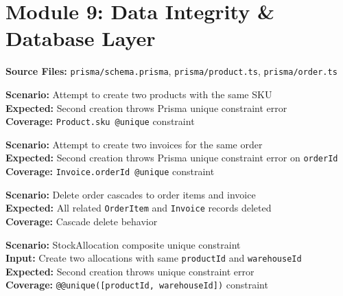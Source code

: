 ﻿\documentclass[12pt,a4paper]{report}
\newcommand{\pone}{\textbf{\color{p1red}P1}}
\newcommand{\ptwo}{\textbf{\color{p2orange}P2}}
\begin{document}
\section{Module 9: Data Integrity \& Database Layer}

\textbf{Source Files:} \texttt{prisma/schema.prisma}, \texttt{prisma/product.ts}, \texttt{prisma/order.ts}

\begin{tcolorbox}[criticalbox,title={DB-001 \hfill \pone\ --- SKU Uniqueness}]
\textbf{Scenario:} Attempt to create two products with the same SKU \\
\textbf{Expected:} Second creation throws Prisma unique constraint error \\
\textbf{Coverage:} \texttt{Product.sku @unique} constraint
\end{tcolorbox}

\begin{tcolorbox}[criticalbox,title={DB-002 \hfill \pone\ --- Invoice Uniqueness}]
\textbf{Scenario:} Attempt to create two invoices for the same order \\
\textbf{Expected:} Second creation throws Prisma unique constraint error on \texttt{orderId} \\
\textbf{Coverage:} \texttt{Invoice.orderId @unique} constraint
\end{tcolorbox}

\begin{tcolorbox}[testbox,title={DB-003 \hfill \ptwo}]
\textbf{Scenario:} Delete order cascades to order items and invoice \\
\textbf{Expected:} All related \texttt{OrderItem} and \texttt{Invoice} records deleted \\
\textbf{Coverage:} Cascade delete behavior
\end{tcolorbox}

\begin{tcolorbox}[testbox,title={DB-004 \hfill \ptwo}]
\textbf{Scenario:} StockAllocation composite unique constraint \\
\textbf{Input:} Create two allocations with same \texttt{productId} and \texttt{warehouseId} \\
\textbf{Expected:} Second creation throws unique constraint error \\
\textbf{Coverage:} \texttt{@@unique([productId, warehouseId])} constraint
\end{tcolorbox}
\end{document}
